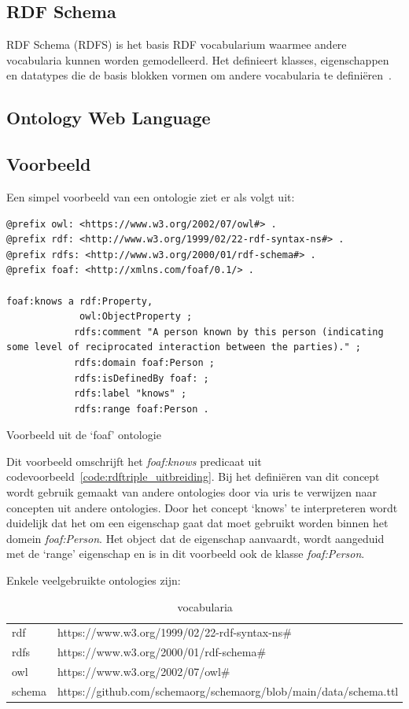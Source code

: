 \subsection{RDF Schema}
RDF Schema (RDFS) is het basis RDF vocabularium waarmee andere vocabularia kunnen worden gemodelleerd. Het definieert klasses, eigenschappen en datatypes die de basis blokken vormen om andere vocabularia te definiëren~\cite{verborgh_webfundamental}. 

\subsection{Ontology Web Language}

\subsection{Voorbeeld}
Een simpel voorbeeld van een \gls{ontologie} ziet er als volgt uit:

\begin{code}
\begin{verbatim}
@prefix owl: <https://www.w3.org/2002/07/owl#> .
@prefix rdf: <http://www.w3.org/1999/02/22-rdf-syntax-ns#> .
@prefix rdfs: <http://www.w3.org/2000/01/rdf-schema#> .
@prefix foaf: <http://xmlns.com/foaf/0.1/> .

foaf:knows a rdf:Property,
             owl:ObjectProperty ;
            rdfs:comment "A person known by this person (indicating some level of reciprocated interaction between the parties)." ;
            rdfs:domain foaf:Person ;
            rdfs:isDefinedBy foaf: ;
            rdfs:label "knows" ;
            rdfs:range foaf:Person .
\end{verbatim}
\caption{Voorbeeld uit de `foaf' ontologie~\cite{foaf_in_turtle}}
\label{code:foaf_ontologie}
\end{code}

Dit voorbeeld omschrijft het \textit{foaf:knows} predicaat uit codevoorbeeld~\ref{code:rdftriple_uitbreiding}. Bij het definiëren van dit concept wordt gebruik gemaakt van andere \glspl{ontologie} door via \acrshort{uri}s te verwijzen naar concepten uit andere \glspl{ontologie}. Door het concept `knows' te interpreteren wordt duidelijk dat het om een eigenschap gaat dat moet gebruikt worden binnen het domein \textit{foaf:Person}. Het object dat de eigenschap aanvaardt, wordt aangeduid met de `range' eigenschap en is in dit voorbeeld ook de klasse \textit{foaf:Person}.

Enkele veelgebruikte \glspl{ontologie} zijn:
\begin{table}[h]
\centering
\caption{vocabularia}
\begin{tabular}{ll}
rdf    & https://www.w3.org/1999/02/22-rdf-syntax-ns\#                    \\
rdfs   & https://www.w3.org/2000/01/rdf-schema\#                          \\
owl    & https://www.w3.org/2002/07/owl\#                                 \\
schema & https://github.com/schemaorg/schemaorg/blob/main/data/schema.ttl
\end{tabular}
\end{table}

